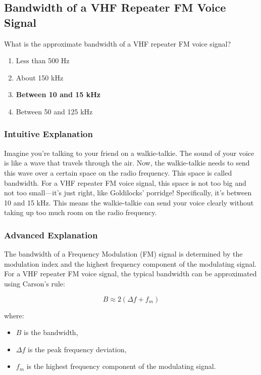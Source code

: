 \subsection{Bandwidth of a VHF Repeater FM Voice Signal}
\label{T8A09}

\begin{tcolorbox}[colback=gray!10!white,colframe=black!75!black,title=T8A09]
What is the approximate bandwidth of a VHF repeater FM voice signal?
\begin{enumerate}[label=\Alph*)]
    \item Less than 500 Hz
    \item About 150 kHz
    \item \textbf{Between 10 and 15 kHz}
    \item Between 50 and 125 kHz
\end{enumerate}
\end{tcolorbox}

\subsubsection{Intuitive Explanation}
Imagine you're talking to your friend on a walkie-talkie. The sound of your voice is like a wave that travels through the air. Now, the walkie-talkie needs to send this wave over a certain space on the radio frequency. This space is called bandwidth. For a VHF repeater FM voice signal, this space is not too big and not too small—it's just right, like Goldilocks' porridge! Specifically, it's between 10 and 15 kHz. This means the walkie-talkie can send your voice clearly without taking up too much room on the radio frequency.

\subsubsection{Advanced Explanation}
The bandwidth of a Frequency Modulation (FM) signal is determined by the modulation index and the highest frequency component of the modulating signal. For a VHF repeater FM voice signal, the typical bandwidth can be approximated using Carson's rule:

\[
B \approx 2(\Delta f + f_m)
\]

where:
\begin{itemize}
    \item \( B \) is the bandwidth,
    \item \( \Delta f \) is the peak frequency deviation,
    \item \( f_m \) is the highest frequency component of the modulating signal.
\end{itemize}

